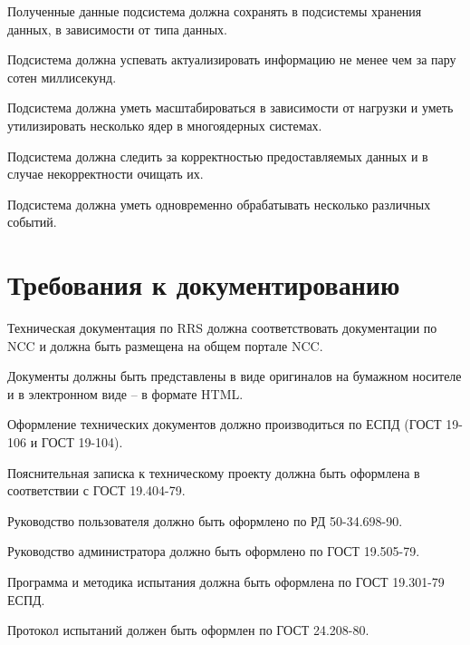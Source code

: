 Полученные данные подсистема должна сохранять в подсистемы хранения данных, в зависимости от типа данных.

Подсистема должна успевать актуализировать информацию не менее чем за пару сотен миллисекунд.

Подсистема должна уметь масштабироваться в зависимости от нагрузки и уметь утилизировать несколько ядер в многоядерных системах.

Подсистема должна следить за корректностью предоставляемых данных и в случае некорректности очищать их.

Подсистема должна уметь одновременно обрабатывать несколько различных событий.

\section{Требования к документированию} %

Техническая документация по RRS должна соответствовать документации по NCC
и должна быть размещена на общем портале NCC\@.

Документы должны быть представлены в виде оригиналов на бумажном носителе и в электронном виде – в формате HTML\@.

Оформление технических документов должно производиться по ЕСПД (ГОСТ 19-106 и ГОСТ 19-104).

Пояснительная записка к техническому проекту должна быть оформлена в соответствии с ГОСТ 19.404-79.

Руководство пользователя должно быть оформлено по РД 50-34.698-90.

Руководство администратора должно быть оформлено по ГОСТ 19.505-79.

Программа и методика испытания должна быть оформлена по ГОСТ 19.301-79 ЕСПД.

Протокол испытаний должен быть оформлен по ГОСТ 24.208-80.